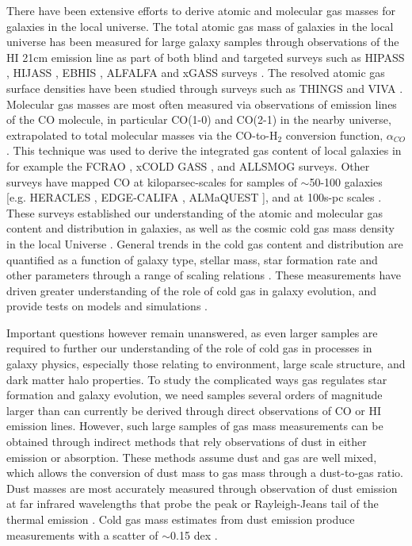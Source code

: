 \documentclass[fleqn,usenatbib]{mnras}
\begin{document}
There have been extensive efforts to derive atomic and molecular gas masses for galaxies in the local universe. The total atomic gas mass of galaxies in the local universe has been measured for large galaxy samples through observations of the HI 21cm emission line as part of both blind and targeted surveys such as HIPASS \citep{barnes2001}, HIJASS \citep{lang2003}, EBHIS \citep{winkel2010}, ALFALFA \citep{haynes2011} and xGASS surveys \citep{catinella2018}. The resolved atomic gas surface densities have been studied through surveys such as THINGS \citep{walter2008} and VIVA \citep{chung2009}.  Molecular gas masses are most often measured via observations of emission lines of the CO molecule, in particular CO(1-0) and CO(2-1) in the nearby universe, extrapolated to total molecular masses via the CO-to-H$_2$ conversion function, $\alpha_{CO}$ . This technique was used to derive the integrated gas content of local galaxies in for example the FCRAO \citep{young95}, xCOLD GASS \citep{saintonge2017}, and  ALLSMOG \citep{cicone17} surveys. Other surveys have mapped CO at kiloparsec-scales for samples of $\sim$50-100 galaxies [e.g. HERACLES \citep{leroy2013}, EDGE-CALIFA \citep{bolatto2017}, ALMaQUEST \citep{lin2019}], and at 100s-pc scales \citep[PHANGS-ALMA, ][]{leroy2021}. These surveys established our understanding of the atomic and molecular gas content and distribution in galaxies, as well as the cosmic cold gas mass density in the local Universe \citep[e.g.][]{casasola2017, jones2018, fletcher2021}. General trends in the cold gas content and distribution are quantified as a function of galaxy type, stellar mass, star formation rate and other parameters through a range of scaling relations \citep[see references above, and overview in ][]{saintonge22}. These measurements have driven greater understanding of the role of cold gas in galaxy evolution, and provide tests on  models and simulations \citep[e.g.][]{lilly2013, dave2020, feldmann2020}. 

Important questions however remain unanswered, as even larger samples are required to further our understanding of the role of cold gas in processes in galaxy physics, especially those relating to environment, large scale structure, and dark matter halo properties. To study the complicated ways gas regulates star formation and galaxy evolution, we need samples several orders of magnitude larger than can currently be derived through direct observations of CO or HI emission lines. However, such large samples of gas mass measurements can be obtained through indirect methods that rely observations of dust in either emission or absorption. These methods assume dust and gas are well mixed, which allows the conversion of dust mass to gas mass through a dust-to-gas ratio. Dust masses are most accurately measured through observation of dust emission at far infrared wavelengths that probe the peak or Rayleigh-Jeans tail of the thermal emission \citep[e.g.][]{scoville2014}. Cold gas mass estimates from dust emission produce measurements with a scatter of $\sim$0.15 dex \citep{janowiecki2018}. 
\end{document}

